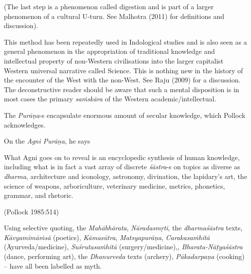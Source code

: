 (The last step is a phenomenon called digestion and is part of a larger phenomenon of a cultural U-turn. See Malhotra (2011) for definitions and discussion).

This method has been repeatedly used in Indological studies and is also seen as a general phenomenon in the appropriation of traditional knowledge and intellectual property of non-Western civilisations into the larger capitalist Western universal narrative called Science. This is nothing new in the history of the encounter of the West with the non-West. See Raju (2009) for a discussion. The deconstructive reader should be aware that such a mental disposition is in most cases the primary {\sl saṁskāra} of the Western academic/intellectual.

The {\sl Purāṇa}-s encapsulate enormous amount of secular knowledge, which Pollock acknowledges.

On the {\sl Agni Purāṇa}, he says
\begin{myquote}
What Agni goes on to reveal is an encyclopedic synthesis of human knowledge, including what is in fact a vast array of discrete {\sl śāstra}-s on topics as diverse as {\sl dharma}, architecture and iconology, astronomy, divination, the lapidary's art, the science of weapons, arboriculture, veterinary medicine, metrics, phonetics, grammar, and rhetoric.

\hfill (Pollock 1985:514)
\end{myquote}

\newpage

Using  selective quoting, the {\sl Mahābhārata}, {\sl Nāradasmṛti},  the {\sl dharma}\-\break\hbox{\sl śāstra} texts, {\sl Kāvyamīmāṁsā} (poetics), {\sl Kāmasūtra},  {\sl Matsyapurāṇa},  {\sl Caraka\-saṁhitā} (Āyurveda/medicine),  {\sl Suśrutasaṁhitā} (surgery/\-medicine),, {\sl Bharata-Nāṭyaśāstra} (dance, performing art), the {\sl Dhanurveda} texts (archery), {\sl Pākadarpaṇa} (cooking) -- have all been labelled as myth.


